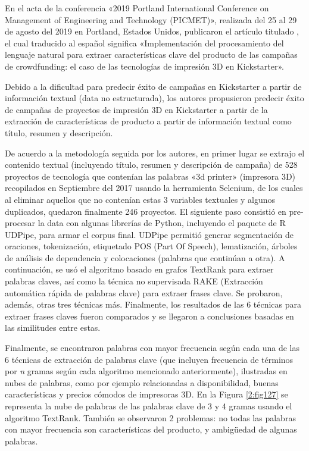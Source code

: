 \newpage
En el acta de la conferencia «2019 Portland International Conference on Management of Engineering and Technology (PICMET)», realizada del 25 al 29 de agosto del 2019 en Portland, Estados Unidos, \cite{pr_chaichi2019nlp_3dprinting} publicaron el artículo titulado , el cual traducido al español significa «Implementación del procesamiento del lenguaje natural para extraer características clave del producto de las campañas de crowdfunding: el caso de las tecnologías de impresión 3D en Kickstarter».

Debido a la dificultad para predecir éxito de campañas en Kickstarter a partir de información textual (data no estructurada), los autores propusieron predecir éxito de campañas de proyectos de impresión 3D en Kickstarter a partir de la extracción de características de producto a partir de información textual como título, resumen y descripción.

De acuerdo a la metodología seguida por los autores, en primer lugar se extrajo el contenido textual (incluyendo título, resumen y descripción de campaña) de 528 proyectos de tecnología que contenían las palabras «3d printer» (impresora 3D) recopilados en Septiembre del 2017 usando la herramienta Selenium, de los cuales al eliminar aquellos que no contenían estas 3 variables textuales y algunos duplicados, quedaron finalmente 246 proyectos. El siguiente paso consistió en pre-procesar la data con algunas librerías de Python, incluyendo el paquete de R UDPipe, para armar el corpus final. UDPipe permitió generar segmentación de oraciones, tokenización, etiquetado POS (Part Of Speech), lematización, árboles de análisis de dependencia y colocaciones (palabras que continúan a otra). A continuación, se usó el algoritmo basado en grafos TextRank para extraer palabras claves, así como la técnica no supervisada RAKE (Extracción automática rápida de palabras clave) para extraer frases clave. Se probaron, además, otras tres técnicas más.
Finalmente, los resultados de las 6 técnicas para extraer frases claves fueron comparados y se llegaron a conclusiones basadas en las similitudes entre estas.

Finalmente, se encontraron palabras con mayor frecuencia según cada una de las 6 técnicas de extracción de palabras clave (que incluyen frecuencia de términos por \textit{n} gramas según cada algoritmo mencionado anteriormente), ilustradas en nubes de palabras, como por ejemplo relacionadas a disponibilidad, buenas características y precios cómodos de impresoras 3D. En la Figura \ref{2:fig127} se representa la nube de palabras de las palabras clave de 3 y 4 gramas usando el algoritmo TextRank. También se observaron 2 problemas: no todas las palabras con mayor frecuencia son características del producto, y ambigüedad de algunas palabras.

